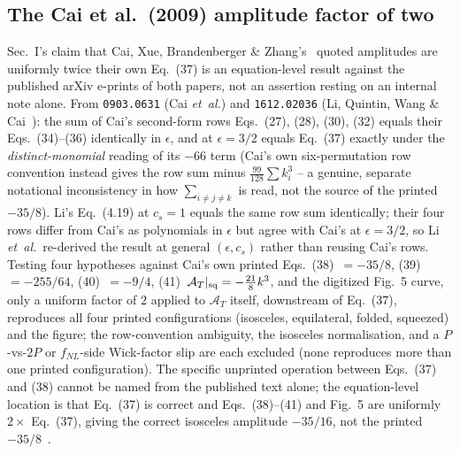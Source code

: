 \documentclass[aps,prd,twocolumn,superscriptaddress,showpacs,preprintnumbers,nofootinbib,longbibliography,floatfix]{revtex4-2}
\newcommand{\eps}{\epsilon}
\newcommand{\etal}{\textit{et~al.}}
\begin{document}
\subsection{The Cai et al.\ (2009) amplitude factor of two}
\label{app:cai}

Sec.~I's claim that Cai, Xue, Brandenberger \& Zhang's~\cite{Cai2009} quoted amplitudes are
uniformly twice their own Eq.~(37) is an equation-level result against the published arXiv
e-prints of both papers, not an assertion resting on an internal note alone. From
\texttt{0903.0631} (Cai \etal) and \texttt{1612.02036} (Li, Quintin, Wang \&
Cai~\cite{LiQuintinWangCai2017}): the sum of Cai's second-form rows Eqs.~(27), (28), (30),
(32) equals their Eqs.~(34)--(36) identically in $\eps$, and at $\eps=3/2$ equals Eq.~(37)
exactly under the \emph{distinct-monomial} reading of its $-66$ term (Cai's own
six-permutation row convention instead gives the row sum minus $\tfrac{99}{128}\sum k_i^3$ --
a genuine, separate notational inconsistency in how $\sum_{i\neq j\neq k}$ is read, not the
source of the printed $-35/8$). Li's Eq.~(4.19) at $c_s=1$ equals the same row sum
identically; their four rows differ from Cai's as polynomials in $\eps$ but agree with Cai's
at $\eps=3/2$, so Li \etal\ re-derived the result at general $(\eps,c_s)$ rather than reusing
Cai's rows. Testing four hypotheses against Cai's own printed Eqs.~(38)~$=-35/8$,
(39)~$=-255/64$, (40)~$=-9/4$, (41)~$\mathcal A_T|_{\rm sq}=-\tfrac{21}{8}k^3$, and the
digitized Fig.~5 curve, only a uniform factor of $2$ applied to $\mathcal A_T$ itself,
downstream of Eq.~(37), reproduces all four printed configurations (isosceles, equilateral,
folded, squeezed) and the figure; the row-convention ambiguity, the isosceles normalisation,
and a $P$-vs-$2P$ or $f_{NL}$-side Wick-factor slip are each excluded (none reproduces more
than one printed configuration). The specific unprinted operation between Eqs.~(37) and (38)
cannot be named from the published text alone; the equation-level location is that Eq.~(37)
is correct and Eqs.~(38)--(41) and Fig.~5 are uniformly $2\times$ Eq.~(37), giving the
correct isosceles amplitude $-35/16$, not the printed $-35/8$~\cite{Golden2026CaiFactor}.
\end{document}

